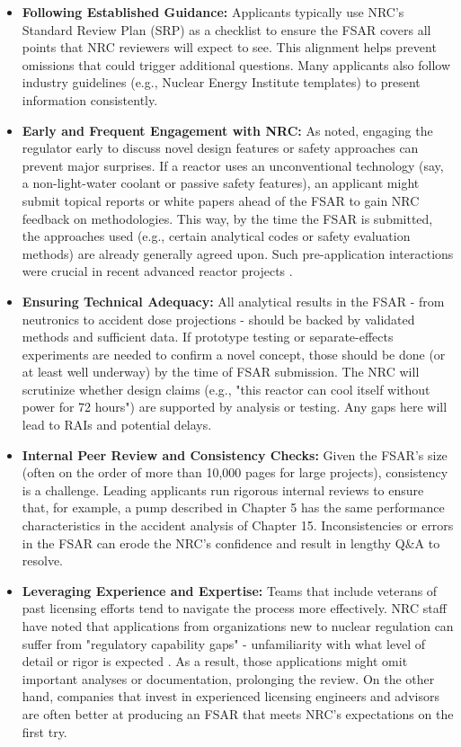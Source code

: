 \documentclass[5p,authoryear]{elsarticle}
\begin{document}
\vspace{0.2cm}
\begin{itemize}
    \item \textbf{Following Established Guidance:} Applicants typically use NRC's Standard Review Plan (SRP) as a checklist to ensure the FSAR covers all points that NRC reviewers will expect to see. This alignment helps prevent omissions that could trigger additional questions. Many applicants also follow industry guidelines (e.g., Nuclear Energy Institute templates) to present information consistently.
    \item \textbf{Early and Frequent Engagement with NRC:} As noted, engaging the regulator early to discuss novel design features or safety approaches can prevent major surprises. If a reactor uses an unconventional technology (say, a non-light-water coolant or passive safety features), an applicant might submit topical reports or white papers ahead of the FSAR to gain NRC feedback on methodologies. This way, by the time the FSAR is submitted, the approaches used (e.g., certain analytical codes or safety evaluation methods) are already generally agreed upon. Such pre-application interactions were crucial in recent advanced reactor projects \cite{NIA2024}.
    \item \textbf{Ensuring Technical Adequacy:} All analytical results in the FSAR - from neutronics to accident dose projections - should be backed by validated methods and sufficient data. If prototype testing or separate-effects experiments are needed to confirm a novel concept, those should be done (or at least well underway) by the time of FSAR submission. The NRC will scrutinize whether design claims (e.g., "this reactor can cool itself without power for 72 hours") are supported by analysis or testing. Any gaps here will lead to RAIs and potential delays.
    \item \textbf{Internal Peer Review and Consistency Checks:} Given the FSAR's size (often on the order of more than 10,000 pages for large projects), consistency is a challenge. Leading applicants run rigorous internal reviews to ensure that, for example, a pump described in Chapter 5 has the same performance characteristics in the accident analysis of Chapter 15. Inconsistencies or errors in the FSAR can erode the NRC's confidence and result in lengthy Q\&A to resolve.
    \item \textbf{Leveraging Experience and Expertise:} Teams that include veterans of past licensing efforts tend to navigate the process more effectively. NRC staff have noted that applications from organizations new to nuclear regulation can suffer from "regulatory capability gaps" - unfamiliarity with what level of detail or rigor is expected \cite{Sam2023}. As a result, those applications might omit important analyses or documentation, prolonging the review. On the other hand, companies that invest in experienced licensing engineers and advisors are often better at producing an FSAR that meets NRC's expectations on the first try.
\end{itemize}
\end{document}
